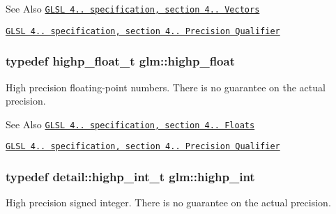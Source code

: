 \begin{DoxySeeAlso}{See Also}
\href{http://www.opengl.org/registry/doc/GLSLangSpec.4.20.8.pdf}{\tt G\-L\-S\-L 4.. specification, section 4.. Vectors} 

\href{http://www.opengl.org/registry/doc/GLSLangSpec.4.20.8.pdf}{\tt G\-L\-S\-L 4.. specification, section 4.. Precision Qualifier} 
\end{DoxySeeAlso}
\hypertarget{group__core__precision_ga3d443a093adc053638ed7f81c5bfe300}{
\subsubsection[{highp\-\_\-float}]{\setlength{\rightskip}{0pt plus 5cm}typedef highp\-\_\-float\-\_\-t {\bf glm\-::highp\-\_\-float}}}\label{group__core__precision_ga3d443a093adc053638ed7f81c5bfe300}
High precision floating-\/point numbers. There is no guarantee on the actual precision.

\begin{DoxySeeAlso}{See Also}
\href{http://www.opengl.org/registry/doc/GLSLangSpec.4.20.8.pdf}{\tt G\-L\-S\-L 4.. specification, section 4.. Floats} 

\href{http://www.opengl.org/registry/doc/GLSLangSpec.4.20.8.pdf}{\tt G\-L\-S\-L 4.. specification, section 4.. Precision Qualifier} 
\end{DoxySeeAlso}
\hypertarget{group__core__precision_gaafed5240eb0a43328cb75faf5fb0a8c2}{
\subsubsection[{highp\-\_\-int}]{\setlength{\rightskip}{0pt plus 5cm}typedef detail\-::highp\-\_\-int\-\_\-t {\bf glm\-::highp\-\_\-int}}}\label{group__core__precision_gaafed5240eb0a43328cb75faf5fb0a8c2}
High precision signed integer. There is no guarantee on the actual precision.

